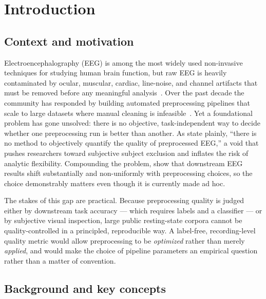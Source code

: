 
\section{Introduction}
\label{sec:intro}

\subsection{Context and motivation}

Electroencephalography (EEG) is among the most widely used non-invasive techniques for studying human brain function, but raw EEG is heavily contaminated by ocular, muscular, cardiac, line-noise, and channel artifacts that must be removed before any meaningful analysis~\cite{MutanenEtAl2018, BlumEtAl2019}. Over the past decade the community has responded by building automated preprocessing pipelines that scale to large datasets where manual cleaning is infeasible~\cite{BigdelyShamloEtAl2015, GabardDurnamEtAl2018, PedroniEtAl2019}. Yet a foundational problem has gone unsolved: there is no objective, task-independent way to decide whether one preprocessing run is better than another. As \citet{PedroniEtAl2019} state plainly, ``there is no method to objectively quantify the quality of preprocessed EEG,'' a void that pushes researchers toward subjective subject exclusion and inflates the risk of analytic flexibility. Compounding the problem, \citet{RobbinsEtAl2020} show that downstream EEG results shift substantially and non-uniformly with preprocessing choices, so the choice demonstrably matters even though it is currently made ad hoc.

The stakes of this gap are practical. Because preprocessing quality is judged either by downstream task accuracy --- which requires labels and a classifier --- or by subjective visual inspection, large public resting-state corpora cannot be quality-controlled in a principled, reproducible way. A label-free, recording-level quality metric would allow preprocessing to be \emph{optimized} rather than merely \emph{applied}, and would make the choice of pipeline parameters an empirical question rather than a matter of convention.

\subsection{Background and key concepts}

